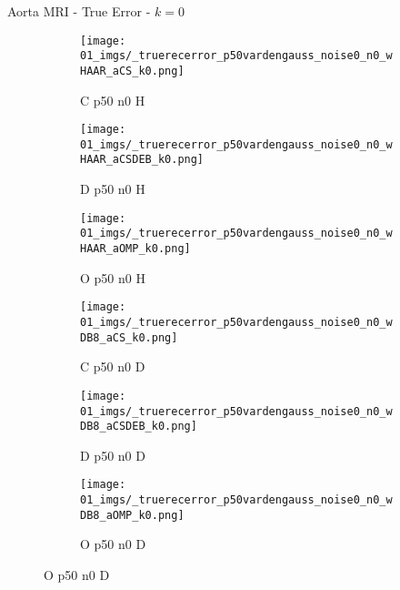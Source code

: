 \begin{frame}{Aorta MRI - True Error - $k=0$}{}
\begin{figure}
\begin{subfigure}{0.13\textwidth}
\texttt{[image: 01\_imgs/\_truerecerror\_p50vardengauss\_noise0\_n0\_wHAAR\_aCS\_k0.png]}
\caption*{\tiny C p50 n0 H}
\end{subfigure}
\begin{subfigure}{0.13\textwidth}
\texttt{[image: 01\_imgs/\_truerecerror\_p50vardengauss\_noise0\_n0\_wHAAR\_aCSDEB\_k0.png]}
\caption*{\tiny D p50 n0 H}
\end{subfigure}
\begin{subfigure}{0.13\textwidth}
\texttt{[image: 01\_imgs/\_truerecerror\_p50vardengauss\_noise0\_n0\_wHAAR\_aOMP\_k0.png]}
\caption*{\tiny O p50 n0 H}
\end{subfigure}
\begin{subfigure}{0.13\textwidth}
\texttt{[image: 01\_imgs/\_truerecerror\_p50vardengauss\_noise0\_n0\_wDB8\_aCS\_k0.png]}
\caption*{\tiny C p50 n0 D}
\end{subfigure}
\begin{subfigure}{0.13\textwidth}
\texttt{[image: 01\_imgs/\_truerecerror\_p50vardengauss\_noise0\_n0\_wDB8\_aCSDEB\_k0.png]}
\caption*{\tiny D p50 n0 D}
\end{subfigure}
\begin{subfigure}{0.13\textwidth}
\texttt{[image: 01\_imgs/\_truerecerror\_p50vardengauss\_noise0\_n0\_wDB8\_aOMP\_k0.png]}
\caption*{\tiny O p50 n0 D}
\end{subfigure}

\vspace{5pt}


\end{figure}
\end{frame}
